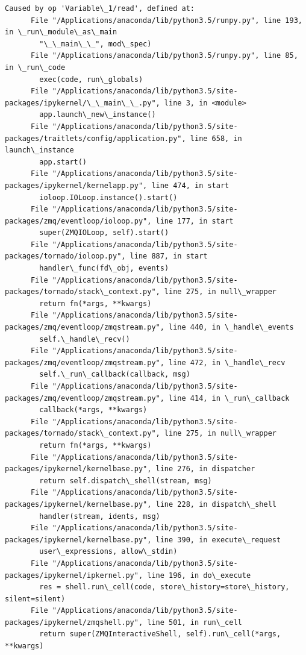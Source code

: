 \documentclass[11pt]{article}
\begin{document}
\begin{Verbatim}[commandchars=\\\{\}]
    Caused by op 'Variable\_1/read', defined at:
      File "/Applications/anaconda/lib/python3.5/runpy.py", line 193, in \_run\_module\_as\_main
        "\_\_main\_\_", mod\_spec)
      File "/Applications/anaconda/lib/python3.5/runpy.py", line 85, in \_run\_code
        exec(code, run\_globals)
      File "/Applications/anaconda/lib/python3.5/site-packages/ipykernel/\_\_main\_\_.py", line 3, in <module>
        app.launch\_new\_instance()
      File "/Applications/anaconda/lib/python3.5/site-packages/traitlets/config/application.py", line 658, in launch\_instance
        app.start()
      File "/Applications/anaconda/lib/python3.5/site-packages/ipykernel/kernelapp.py", line 474, in start
        ioloop.IOLoop.instance().start()
      File "/Applications/anaconda/lib/python3.5/site-packages/zmq/eventloop/ioloop.py", line 177, in start
        super(ZMQIOLoop, self).start()
      File "/Applications/anaconda/lib/python3.5/site-packages/tornado/ioloop.py", line 887, in start
        handler\_func(fd\_obj, events)
      File "/Applications/anaconda/lib/python3.5/site-packages/tornado/stack\_context.py", line 275, in null\_wrapper
        return fn(*args, **kwargs)
      File "/Applications/anaconda/lib/python3.5/site-packages/zmq/eventloop/zmqstream.py", line 440, in \_handle\_events
        self.\_handle\_recv()
      File "/Applications/anaconda/lib/python3.5/site-packages/zmq/eventloop/zmqstream.py", line 472, in \_handle\_recv
        self.\_run\_callback(callback, msg)
      File "/Applications/anaconda/lib/python3.5/site-packages/zmq/eventloop/zmqstream.py", line 414, in \_run\_callback
        callback(*args, **kwargs)
      File "/Applications/anaconda/lib/python3.5/site-packages/tornado/stack\_context.py", line 275, in null\_wrapper
        return fn(*args, **kwargs)
      File "/Applications/anaconda/lib/python3.5/site-packages/ipykernel/kernelbase.py", line 276, in dispatcher
        return self.dispatch\_shell(stream, msg)
      File "/Applications/anaconda/lib/python3.5/site-packages/ipykernel/kernelbase.py", line 228, in dispatch\_shell
        handler(stream, idents, msg)
      File "/Applications/anaconda/lib/python3.5/site-packages/ipykernel/kernelbase.py", line 390, in execute\_request
        user\_expressions, allow\_stdin)
      File "/Applications/anaconda/lib/python3.5/site-packages/ipykernel/ipkernel.py", line 196, in do\_execute
        res = shell.run\_cell(code, store\_history=store\_history, silent=silent)
      File "/Applications/anaconda/lib/python3.5/site-packages/ipykernel/zmqshell.py", line 501, in run\_cell
        return super(ZMQInteractiveShell, self).run\_cell(*args, **kwargs)

\end{Verbatim}
\end{document}

